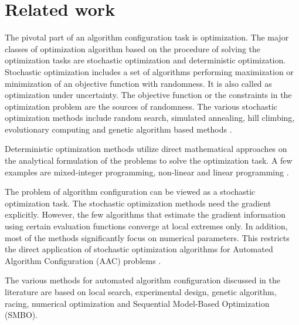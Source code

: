
\chapter{Related work}
\label{chapter:stateoftheart}

The pivotal part of an algorithm configuration task is optimization. The major classes of optimization algorithm based on the procedure of solving the optimization tasks are stochastic optimization and deterministic optimization. Stochastic optimization includes a set of algorithms performing maximization or minimization of an objective function with randomness. It is also called as optimization under uncertainty. The objective function or the constraints in the optimization problem are the sources of randomness. The various stochastic optimization methods include random search, simulated annealing, hill climbing, evolutionary computing and genetic algorithm based methods \cite{Spall_2003}.

Deterministic optimization methods utilize direct mathematical approaches on the analytical formulation of the problems to solve the optimization task. A few examples are mixed-integer programming, non-linear and linear programming \cite{Deterministic_optimization_Review} \cite{Deterministic_optimization}.

The problem of algorithm configuration can be viewed as a stochastic optimization task. The stochastic optimization methods \cite{Spall_2003} need the gradient explicitly. However, the few algorithms that estimate the gradient information using certain evaluation functions converge at local extremes only. In addition, most of the methods significantly focus on numerical parameters. This restricts the direct application of stochastic optimization algorithms for Automated Algorithm Configuration (AAC) problems \cite{AAC_Mainreview}.

The various methods for automated algorithm configuration discussed in the literature are based on local search, experimental design, genetic algorithm, racing, numerical optimization and Sequential Model-Based Optimization (SMBO).


